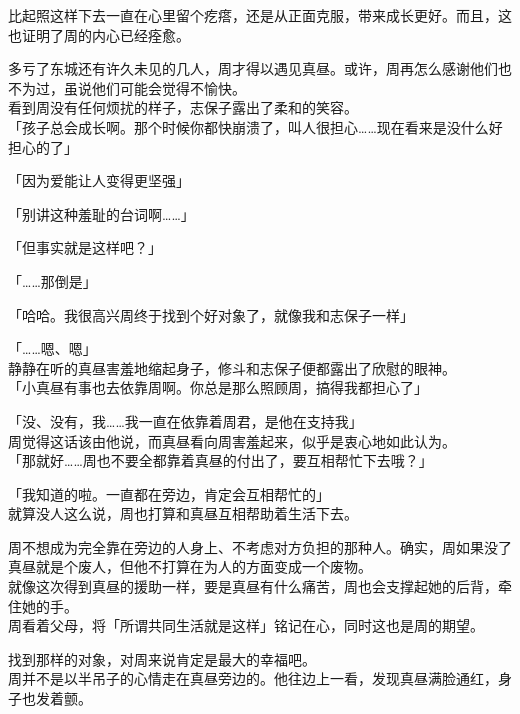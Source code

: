 比起照这样下去一直在心里留个疙瘩，还是从正面克服，带来成长更好。而且，这也证明了周的内心已经痊愈。

多亏了东城还有许久未见的几人，周才得以遇见真昼。或许，周再怎么感谢他们也不为过，虽说他们可能会觉得不愉快。\\

看到周没有任何烦扰的样子，志保子露出了柔和的笑容。\\

「孩子总会成长啊。那个时候你都快崩溃了，叫人很担心……现在看来是没什么好担心的了」

「因为爱能让人变得更坚强」

「别讲这种羞耻的台词啊……」

「但事实就是这样吧？」

「……那倒是」

「哈哈。我很高兴周终于找到个好对象了，就像我和志保子一样」

「……嗯、嗯」\\

静静在听的真昼害羞地缩起身子，修斗和志保子便都露出了欣慰的眼神。\\

「小真昼有事也去依靠周啊。你总是那么照顾周，搞得我都担心了」

「没、没有，我……我一直在依靠着周君，是他在支持我」\\

周觉得这话该由他说，而真昼看向周害羞起来，似乎是衷心地如此认为。\\

「那就好……周也不要全都靠着真昼的付出了，要互相帮忙下去哦？」

「我知道的啦。一直都在旁边，肯定会互相帮忙的」\\

就算没人这么说，周也打算和真昼互相帮助着生活下去。

周不想成为完全靠在旁边的人身上、不考虑对方负担的那种人。确实，周如果没了真昼就是个废人，但他不打算在为人的方面变成一个废物。\\

就像这次得到真昼的援助一样，要是真昼有什么痛苦，周也会支撑起她的后背，牵住她的手。\\

周看着父母，将「所谓共同生活就是这样」铭记在心，同时这也是周的期望。

找到那样的对象，对周来说肯定是最大的幸福吧。\\

周并不是以半吊子的心情走在真昼旁边的。他往边上一看，发现真昼满脸通红，身子也发着颤。

